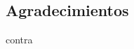 \documentclass[11pt, oneside]{book}
\author{José Luis Garrido Castro}
\begin{document}
\frontmatter

\portada

\begin{dedicatoria}
    \chapter*{Agradecimientos}

\end{dedicatoria}





\mainmatter
\marcagua







\clearpage
\backmatter
 {contra}
\end{document}
